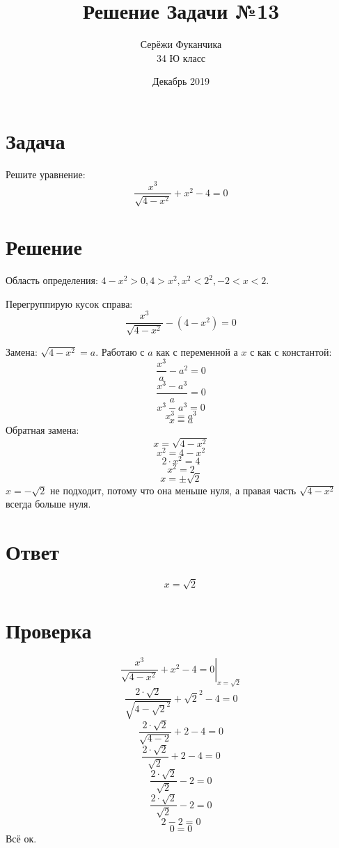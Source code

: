\documentclass{article}
\title{Решение Задачи №13}
\author{Серёжи Фуканчика\\34 Ю класс}
\date{Декабрь 2019}
\begin{document}
\maketitle

\section{Задача}
Решите уравнение:
$$\frac{x^3}{\sqrt{4-x^2}}+x^2-4=0$$

\section{Решение}
Область определения: $4-x^2>0, 4>x^2, x^2<2^2, -2<x<2$.

Перегруппирую кусок справа:
$$\frac{x^3}{\sqrt{4-x^2}}-(4-x^2)=0$$

Замена: $\sqrt{4-x^2}=a$. Работаю с $a$ как с переменной а $x$ с как с
константой:
$$\frac{x^3}{a}-a^2=0$$
$$\frac{x^3-a^3}{a}=0$$
$$x^3-a^3=0$$
$$x^3=a^3$$
$$x=a$$
Обратная замена:
$$x=\sqrt{4-x^2}$$
$$x^2=4-x^2$$
$$2\cdot{}x^2=4$$
$$x^2=2$$
$$x=\pm{}\sqrt{2}$$
$x=-\sqrt{2}$ не подходит, потому что она меньше нуля, а правая часть
$\sqrt{4-x^2}$ всегда больше нуля.

\section{Ответ}
$$x=\sqrt{2}$$

\section{Проверка}
$$\left.\frac{x^3}{\sqrt{4-x^2}}+x^2-4=0\right|_{x=\sqrt{2}}$$
$$\frac{2\cdot{}\sqrt{2}}{\sqrt{4-\sqrt{2}^2}}+\sqrt{2}^2-4=0$$
$$\frac{2\cdot{}\sqrt{2}}{\sqrt{4-2}}+2-4=0$$
$$\frac{2\cdot{}\sqrt{2}}{\sqrt{2}}+2-4=0$$
$$\frac{2\cdot{}\sqrt{2}}{\sqrt{2}}-2=0$$
$$\frac{2\cdot{}\sqrt{2}}{\sqrt{2}}-2=0$$
$$2-2=0$$
$$0=0$$
Всё ок.
\end{document}
